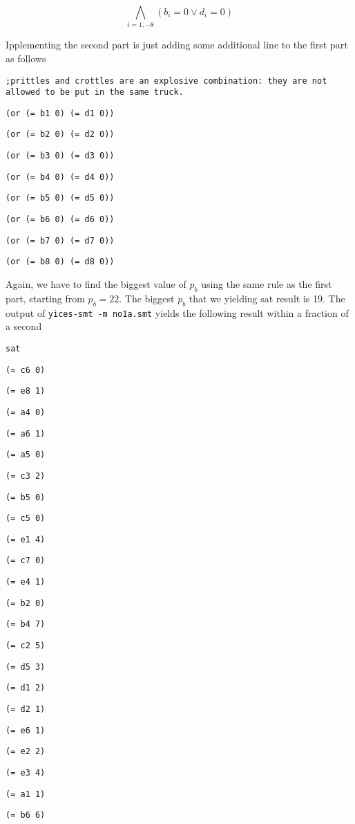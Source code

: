 \documentclass[12pt]{article}
\begin{document}
\[ \bigwedge_{i=1,\cdots 8}  (b_i=0 \vee d_i=0)  \]

Ipplementing the second part is just adding some additional line to the first part as follows

{ \footnotesize
{\tt ;prittles and crottles are an explosive combination: they are not allowed to be put in the same truck. }

{\tt (or (= b1 0) (= d1 0)) }

{\tt (or (= b2 0) (= d2 0)) }

{\tt (or (= b3 0) (= d3 0)) }

{\tt (or (= b4 0) (= d4 0)) }

{\tt (or (= b5 0) (= d5 0)) }

{\tt (or (= b6 0) (= d6 0)) }

{\tt (or (= b7 0) (= d7 0)) }

{\tt (or (= b8 0) (= d8 0)) }

}
Again, we have to find the biggest value of $p_b$ using the same rule as the first part, starting from $p_b=22$. The biggest $p_b$ that we yielding sat result is 19. The output of {\tt yices-smt -m no1a.smt} yields the following result within a fraction of a second


{\tt sat }

{\tt  }

{\tt (= c6 0) }

{\tt (= e8 1) }

{\tt (= a4 0) }

{\tt (= a6 1) }

{\tt (= a5 0) }

{\tt (= c3 2) }

{\tt (= b5 0) }

{\tt (= c5 0) }

{\tt (= e1 4) }

{\tt (= c7 0) }

{\tt (= e4 1) }

{\tt (= b2 0) }

{\tt (= b4 7) }

{\tt (= c2 5) }

{\tt (= d5 3) }

{\tt (= d1 2) }

{\tt (= d2 1) }

{\tt (= e6 1) }

{\tt (= e2 2) }

{\tt (= e3 4) }

{\tt (= a1 1) }

{\tt (= b6 6) }
\end{document}
